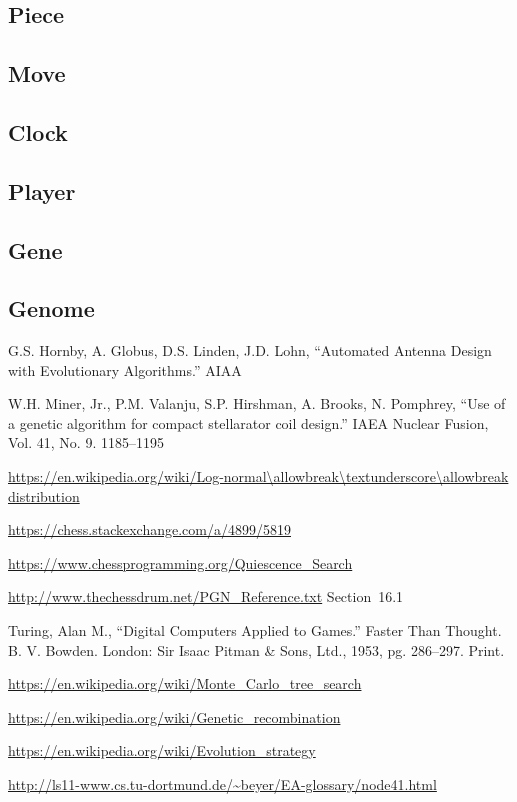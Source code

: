 \documentclass[letterpaper]{article}
\renewcommand{\_}{\allowbreak\textunderscore\allowbreak}
\begin{document}
\subsection{Piece}

\subsection{Move}

\subsection{Clock}

\subsection{Player}

\subsection{Gene}

\subsection{Genome}



\begin{thebibliography}{9}

G.S. Hornby, A. Globus, D.S. Linden, J.D. Lohn, ``Automated Antenna Design with Evolutionary Algorithms.'' AIAA

W.H. Miner, Jr., P.M. Valanju, S.P. Hirshman, A. Brooks, N. Pomphrey, ``Use of a genetic algorithm for compact stellarator coil design.'' IAEA Nuclear Fusion, Vol. 41, No. 9. 1185--1195

\url{https://en.wikipedia.org/wiki/Log-normal\_distribution}

\url{https://chess.stackexchange.com/a/4899/5819}

\url{https://www.chessprogramming.org/Quiescence_Search}

\url{http://www.thechessdrum.net/PGN_Reference.txt} Section~16.1

Turing, Alan M., ``Digital Computers Applied to Games.'' Faster Than Thought. B. V. Bowden. London: Sir Isaac Pitman \& Sons, Ltd., 1953, pg. 286--297. Print.

\url{https://en.wikipedia.org/wiki/Monte_Carlo_tree_search}

\url{https://en.wikipedia.org/wiki/Genetic_recombination}

\url{https://en.wikipedia.org/wiki/Evolution_strategy}

\url{http://ls11-www.cs.tu-dortmund.de/~beyer/EA-glossary/node41.html}

\end{thebibliography}
\end{document}
